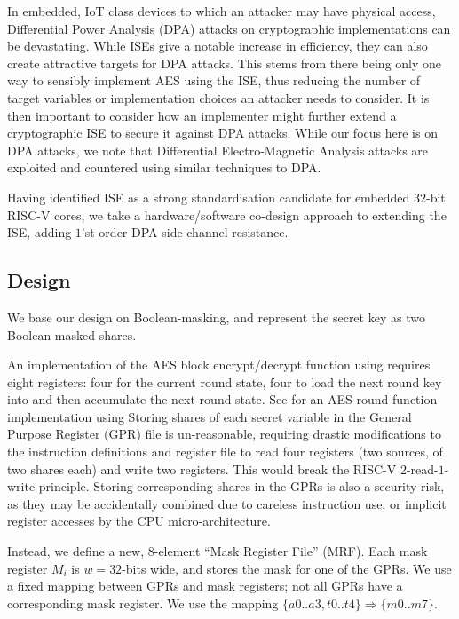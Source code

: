 
In embedded, IoT class devices to which an attacker may have
physical access,
Differential Power Analysis (DPA) attacks on cryptographic implementations
\cite{KJJ:99} can be devastating.
While ISEs give a notable increase in efficiency, they can also create
attractive targets for DPA attacks.
This stems from there being only one way to sensibly implement
AES using the ISE, thus reducing the number of target variables or
implementation choices an attacker needs to consider.
It is then important to consider how an implementer might
further extend a cryptographic ISE to secure it against DPA attacks.
While our focus here is on DPA attacks, we note that Differential
Electro-Magnetic Analysis attacks are exploited and countered using
similar techniques to DPA.

Having identified ISE  as a strong standardisation candidate
for embedded $32$-bit RISC-V cores, we take a hardware/software co-design
approach to extending the ISE, adding $1$'st order DPA side-channel
resistance.

\subsection{Design}

We base our design on Boolean-masking, and represent the secret
key as two Boolean masked shares.

An implementation of the AES block encrypt/decrypt function 
using  requires eight registers:
four for the current round state,
four to load the next round key into
and
then accumulate the next round state.
See  for an AES round function implementation
using 
Storing shares of each secret variable
in the General Purpose Register (GPR) file is un-reasonable,
requiring drastic modifications to the instruction definitions and
register file to read four registers (two sources, of two shares each) and
write two registers.
This would break the RISC-V $2$-read-$1$-write principle.
Storing corresponding shares in the GPRs is also a security
risk, as they may be accidentally combined due to
careless instruction use, or implicit register accesses by the
CPU micro-architecture.

Instead, we define a new, $8$-element ``Mask Register File'' (MRF).
Each mask register $M_i$ is $w=32$-bits wide, and stores the mask for
one of the GPRs.
We use a fixed mapping between GPRs and mask registers;
not all GPRs have a corresponding mask register.
We use the mapping $\{a0..a3,t0..t4\} \Rightarrow \{m0..m7\}$.

